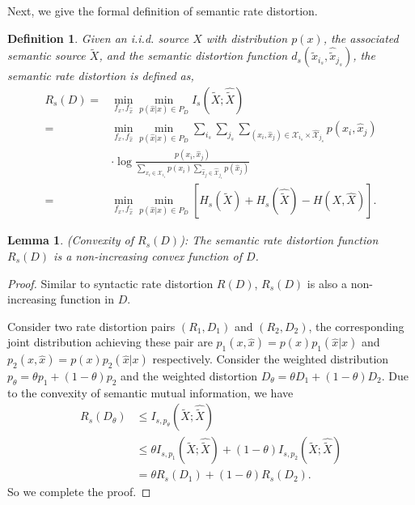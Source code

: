 \documentclass[12pt, draftclsnofoot,onecolumn]{IEEEtran}
\newtheorem{lemma}{\bf{Lemma}}
\newtheorem{definition}{\bf{Definition}}
\begin{document}
Next, we give the formal definition of semantic rate distortion.
\begin{definition}
Given an i.i.d. source $X$ with distribution $p(x)$, the associated semantic source $\tilde{X}$, and the semantic distortion function $d_s(\tilde{x}_{i_s},\hat{\tilde{x}}_{j_s})$, the semantic rate distortion is defined as,
\begin{equation}
\begin{aligned}
R_s(D)=&\min_{f_{x},f_{\hat{x}}}\min_{p(\hat{x}\left|x\right.)\in P_D}I_s(\tilde{X};\hat{\tilde{X}})\\
=&\min_{f_{x},f_{\hat{x}}}\min_{p(\hat{x}\left|x\right.)\in P_D} \sum_{i_s}\sum_{j_s}\sum_{(x_i,\hat{x}_j)\in {\mathcal{X}_{i_s}}\times {\hat{\mathcal{X}}_{j_s}}}p\left(x_i,\hat{x}_j\right) \\
&\cdot \log \frac{p\left(x_i,\hat{x}_j\right)}{\sum_{x_i \in {\mathcal{X}_{i_s}}}p\left(x_i\right) \sum_{\hat{x}_j \in {\hat{\mathcal{X}}_{j_s}}}p\left(\hat{x}_j\right)}\\
=&\min_{f_{x},f_{\hat{x}}}\min_{p(\hat{x}\left|x\right.)\in P_D} \left[H_s(\tilde{X})+H_s(\hat{\tilde{X}})-H(X,\hat{X})\right].
\end{aligned}
\end{equation}
\end{definition}

\begin{lemma}(Convexity of $R_s(D)$):
The semantic rate distortion function $R_s(D)$ is a non-increasing convex function of $D$.
\end{lemma}
\begin{proof}
Similar to syntactic rate distortion $R(D)$, $R_s(D)$ is also a non-increasing function in $D$.

Consider two rate distortion pairs $(R_1,D_1)$ and $(R_2,D_2)$, the corresponding joint distribution achieving these pair are $p_1(x,\hat{x})=p(x)p_1(\hat{x}|x)$ and $p_2(x,\hat{x})=p(x)p_2(\hat{x}|x)$ respectively. Consider the weighted distribution $p_{\theta}=\theta p_1+(1-\theta) p_2$ and the weighted distortion $D_\theta=\theta D_1+(1-\theta) D_2$. Due to the convexity of semantic mutual information, we have
\begin{equation}
\begin{aligned}
R_s(D_\theta) &\leq I_{s,p_\theta}(\tilde{X};\hat{\tilde{X}})\\
                          &\leq \theta I_{s,p_1}(\tilde{X};\hat{\tilde{X}})+(1-\theta) I_{s,p_2}(\tilde{X};\hat{\tilde{X}})\\
                          &=\theta R_s(D_1)+(1-\theta) R_s(D_2).
\end{aligned}
\end{equation}
So we complete the proof.
\end{proof}
\end{document}
